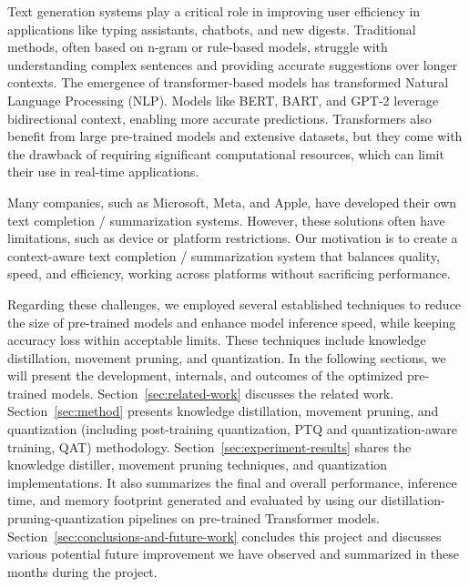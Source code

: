 Text generation systems play a critical role in improving user efficiency in applications like typing assistants,
chatbots, and new digests.
Traditional methods, often based on n-gram or rule-based models, struggle with understanding complex sentences
and providing accurate suggestions over longer contexts.
The emergence of transformer-based models has transformed Natural Language Processing (NLP).
Models like BERT, BART, and GPT-2 leverage bidirectional context, enabling more accurate predictions.
Transformers also benefit from large pre-trained models and extensive datasets,
but they come with the drawback of requiring significant computational resources,
which can limit their use in real-time applications.

Many companies, such as Microsoft, Meta, and Apple, have developed their own text completion / summarization systems.
However, these solutions often have limitations, such as device or platform restrictions.
Our motivation is to create a context-aware text completion / summarization system that balances quality,
speed, and efficiency, working across platforms without sacrificing performance.

Regarding these challenges, we employed several established techniques to reduce the size of pre-trained models
and enhance model inference speed, while keeping accuracy loss within acceptable limits.
These techniques include knowledge distillation, movement pruning, and quantization.
In the following sections, we will present the development, internals, and outcomes of the optimized pre-trained models.
Section~\ref{sec:related-work} discusses the related work.
Section~\ref{sec:method} presents knowledge distillation, movement pruning, and quantization
(including post-training quantization, PTQ and quantization-aware training, QAT) methodology.
Section~\ref{sec:experiment-results} shares the knowledge distiller, movement pruning techniques, and quantization implementations.
It also summarizes the final and overall performance, inference time,
and memory footprint generated and evaluated by using our distillation-pruning-quantization pipelines
on pre-trained Transformer models.
Section~\ref{sec:conclusions-and-future-work} concludes this project and discusses various potential future improvement
we have observed and summarized in these months during the project.
